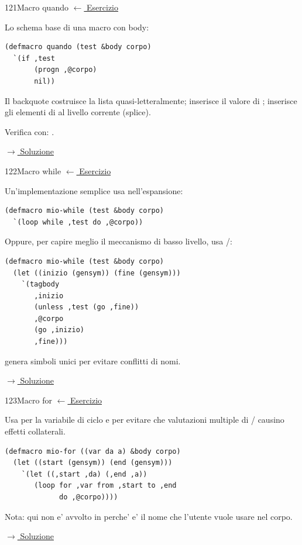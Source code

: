 
\label{hint:121}
\begin{hintbox}{121}{Macro quando}
\small\color{black!55}\hyperref[ex:121]{$\leftarrow$ Esercizio}\normalsize\color{black}

Lo schema base di una macro con body:
\begin{lstlisting}
(defmacro quando (test &body corpo)
  `(if ,test
       (progn ,@corpo)
       nil))
\end{lstlisting}
Il backquote costruisce la lista quasi-letteralmente;
 inserisce il valore di ;
 inserisce gli elementi di 
al livello corrente (splice).

Verifica con: .

\small\color{black!55}\hyperref[sol:121]{$\rightarrow$ Soluzione}\normalsize\color{black}
\end{hintbox}

\label{hint:122}
\begin{hintbox}{122}{Macro while}
\small\color{black!55}\hyperref[ex:122]{$\leftarrow$ Esercizio}\normalsize\color{black}

Un'implementazione semplice usa  nell'espansione:
\begin{lstlisting}
(defmacro mio-while (test &body corpo)
  `(loop while ,test do ,@corpo))
\end{lstlisting}
Oppure, per capire meglio il meccanismo di basso livello,
usa /:
\begin{lstlisting}
(defmacro mio-while (test &body corpo)
  (let ((inizio (gensym)) (fine (gensym)))
    `(tagbody
       ,inizio
       (unless ,test (go ,fine))
       ,@corpo
       (go ,inizio)
       ,fine)))
\end{lstlisting}
 genera simboli unici per evitare conflitti di nomi.

\small\color{black!55}\hyperref[sol:122]{$\rightarrow$ Soluzione}\normalsize\color{black}
\end{hintbox}

\label{hint:123}
\begin{hintbox}{123}{Macro for}
\small\color{black!55}\hyperref[ex:123]{$\leftarrow$ Esercizio}\normalsize\color{black}

Usa  per la variabile di ciclo e per evitare che
valutazioni multiple di / causino effetti collaterali.
\begin{lstlisting}
(defmacro mio-for ((var da a) &body corpo)
  (let ((start (gensym)) (end (gensym)))
    `(let ((,start ,da) (,end ,a))
       (loop for ,var from ,start to ,end
             do ,@corpo))))
\end{lstlisting}
Nota: qui  non e' avvolto in  perche'
e' il nome che l'utente vuole usare nel corpo.

\small\color{black!55}\hyperref[sol:123]{$\rightarrow$ Soluzione}\normalsize\color{black}
\end{hintbox}

